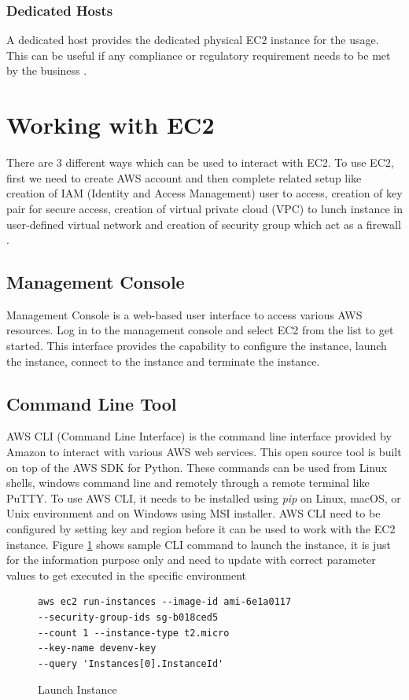\subsubsection{Dedicated Hosts} 
A dedicated host provides the dedicated physical EC2 instance for the usage. This can be useful if any compliance or regulatory requirement needs to be met by the business \cite{www-aws-ec2Pricing}.

\section{Working with EC2}
There are 3 different ways which can be used to interact with EC2. To use EC2, first we need to create AWS account and then complete related setup like creation of IAM (Identity and Access Management) user to access, creation of key pair for secure access, creation of virtual private cloud (VPC) to lunch instance in user-defined virtual network and creation of security group which act as a firewall \cite{www-aws-ec2-setup}.

\subsection{Management Console}
Management Console \cite{www-aws-ec2-gettingStarted} is a web-based user interface to access various AWS resources. Log in to the management console and select EC2 from the list to get started. This interface provides the capability to configure the instance, launch the instance, connect to the instance and terminate the instance.

\subsection{Command Line Tool}
AWS CLI (Command Line Interface) \cite{www-aws-ec2-cli} is the command line interface provided by Amazon to interact with various AWS web services. This open source tool is built on top of the AWS SDK for Python. These commands can be used from Linux shells, windows command line and remotely through a remote terminal like PuTTY. To use AWS CLI, it needs to be installed using \emph{pip} on Linux, macOS, or Unix environment and on Windows using MSI installer. AWS CLI need to be configured by setting key and region before it can be used to work with the EC2 instance.
Figure \ref{c:cli-launch} shows sample CLI command to launch the instance, it is just for the information purpose only and need to update with correct parameter values to get executed in the specific environment
\begin{figure}[htb]
\begin{verbatim}
aws ec2 run-instances --image-id ami-6e1a0117
--security-group-ids sg-b018ced5 
--count 1 --instance-type t2.micro 
--key-name devenv-key 
--query 'Instances[0].InstanceId'
\end{verbatim}
\caption{Launch Instance \cite{www-aws-ec2-cli}}\label{c:cli-launch}
\end{figure}

